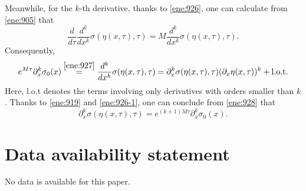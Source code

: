 \documentclass[11pt]{article}
\theoremstyle{plain}
\theoremstyle{definition}
\theoremstyle{remark}
\newcommand{\mrm}[1]{\mathrm{#1}}
\newcommand{\dx}{\partial_x}
\numberwithin{equation}{section}
\begin{document}
Meanwhile, for the $ k $-th derivative, thanks to \eqref{ene:926}, one can calculate from \eqref{ene:905} that 
\begin{equation}
    \label{ene:927}
    \dfrac{d}{d\tau} \dfrac{d^k}{dx^k} \sigma(\eta(x,\tau),\tau) = M \dfrac{d^k}{dx^k} \sigma(\eta(x,\tau),\tau).
\end{equation} 
Consequently, 
\begin{equation}
    \label{ene:928}
    e^{M\tau} \dx^k \sigma_0(x) \stackrel{\eqref{ene:927}}{=} \dfrac{d^k}{dx^k} \sigma(\eta(x,\tau),\tau) = \partial_x^k \sigma(\eta(x,\tau),\tau) (\dx \eta(x,\tau))^k + \mrm{l.o.t}. 
\end{equation}
Here, $ \mrm{l.o.t} $ denotes the terms involving only derivatives with orders smaller than $ k $. Thanks to \eqref{ene:919} and \eqref{ene:926-1}, one can conclude from \eqref{ene:928} that
\begin{equation}
    \label{ene:929}
    \dx^k\sigma(\eta(x,\tau),\tau) = e^{(k+1)M\tau} \dx^k\sigma_0(x).
\end{equation}

\section*{Data availability statement}
No data is available for this paper.

\end{document}
